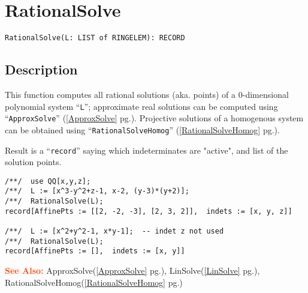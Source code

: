 \documentclass[a4paper]{mybook}
\newenvironment{command}{}{} %
\newcommand\SeeAlso{\par\textcolor{OrangeRed}{\textbf{\large See Also: }}}
\begin{document}
\section{RationalSolve}
\label{RationalSolve}
\begin{command} %


\begin{Verbatim}[label=syntax, rulecolor=\color{MidnightBlue},
frame=single]
RationalSolve(L: LIST of RINGELEM): RECORD
\end{Verbatim}


\subsection*{Description}

This function computes all rational solutions (aka. points)
of a 0-dimensional polynomial system ``\verb&L&''; approximate
real solutions can be computed using ``\verb&ApproxSolve&'' (\ref{ApproxSolve} pg.\pageref{ApproxSolve}).
Projective solutions of a homogenous system can be obtained
using ``\verb&RationalSolveHomog&'' (\ref{RationalSolveHomog} pg.\pageref{RationalSolveHomog}).
\par 
Result is a ``\verb&record&'' saying which indeterminates are "active",
and list of the solution points.
\begin{Verbatim}[label=example, rulecolor=\color{PineGreen}, frame=single]
/**/  use QQ[x,y,z];
/**/  L := [x^3-y^2+z-1, x-2, (y-3)*(y+2)];
/**/  RationalSolve(L);
record[AffinePts := [[2, -2, -3], [2, 3, 2]],  indets := [x, y, z]]

/**/  L := [x^2+y^2-1, x*y-1];  -- indet z not used
/**/  RationalSolve(L);
record[AffinePts := [],  indets := [x, y]]
\end{Verbatim}


\SeeAlso %
  ApproxSolve(\ref{ApproxSolve} pg.\pageref{ApproxSolve}), 
    LinSolve(\ref{LinSolve} pg.\pageref{LinSolve}), 
    RationalSolveHomog(\ref{RationalSolveHomog} pg.\pageref{RationalSolveHomog})
\end{command} %
\end{document}
